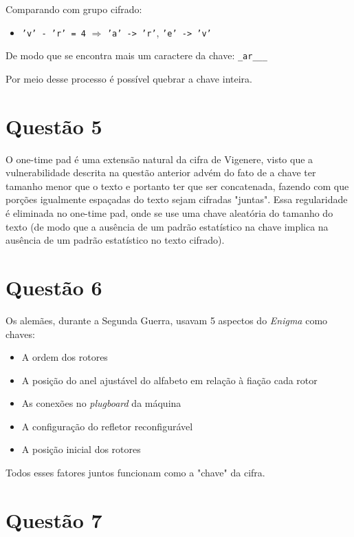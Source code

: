 \documentclass{article}
\begin{document}
    Comparando com grupo cifrado:

    \begin{itemize}
        \item \texttt{'v' - 'r' = 4} $\Rightarrow$ \texttt{'a' -> 'r'}, \texttt{'e' -> 'v'}
    \end{itemize}

    De modo que se encontra mais um caractere da chave: \texttt{\_ar\_\_\_}

    Por meio desse processo é possível quebrar a chave inteira.

    \section*{Questão 5}

    O one-time pad é uma extensão natural da cifra de Vigenere, visto que a vulnerabilidade descrita na questão anterior advém do fato de a chave ter tamanho menor que o texto e portanto ter que ser concatenada, fazendo com que porções igualmente espaçadas do texto sejam cifradas "juntas". Essa regularidade é eliminada no one-time pad, onde se use uma chave aleatória do tamanho do texto (de modo que a ausência de um padrão estatístico na chave implica na ausência de um padrão estatístico no texto cifrado).

    \section*{Questão 6}

    Os alemães, durante a Segunda Guerra, usavam 5 aspectos do \textit{Enigma} como chaves:
    \begin{itemize}
        \item A ordem dos rotores
        \item A posição do anel ajustável do alfabeto em relação à fiação cada rotor
        \item As conexões no \textit{plugboard} da máquina
        \item A configuração do refletor reconfigurável
        \item A posição inicial dos rotores
    \end{itemize}

    Todos esses fatores juntos funcionam como a "chave" da cifra.
    
    \section*{Questão 7}
\end{document}

